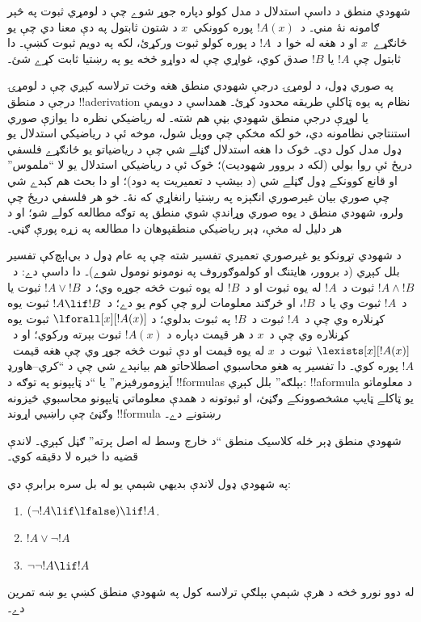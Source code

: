 \documentclass[../../../include/open-logic-section]{subfiles}
\begin{document}
شهودي منطق د داسې استدلال د مدل کولو دپاره جوړ شوے چې د لومړي ثبوت
په څېر ګامونه نۀ مني۔ د~$!A(x)$ پوره کوونکي~$x$ د شتون ثابتول په دې
معنا دي چې يو ځانګړے~$x$ او د هغه له خوا د~$!A$ د پوره کولو ثبوت
ورکړئ، لکه په دويم ثبوت کښې۔ دا ثابتول چې $!A$ يا $!B$ صدق کوي،
غواړي چې له دواړو څخه يو په رښتيا ثابت کړے شئ۔

په صوري ډول، د لومړۍ درجې شهودي منطق هغه وخت ترلاسه کېږي چې د لومړۍ
درجې د منطق !!a{derivation} نظام په يوه ټاکلې طريقه محدود کړئ۔ همداسې
د دويمې يا لوړې درجې منطق شهودي بڼې هم شته۔ له رياضيکي نظره دا يوازې
صوري استنتاجي نظامونه دي، خو لکه مخکې چې وويل شول، موخه ئې د رياضيکي
استدلال يو ډول مدل کول دي۔ څوک دا هغه استدلال ګڼلے شي چې د رياضياتو
يو ځانګړے فلسفي دريځ ئې روا بولي (لکه د بروور شهوديت)؛ څوک ئې د
رياضيکي استدلال يو لا ``ملموس'' او قانع کوونکے ډول ګڼلے شي (د بيشپ د
تعميريت په دود)؛ او دا بحث هم کېدے شي چې صوري بيان غيرصوري انګېزه په
رښتيا رانغاړي که نۀ۔ خو هر فلسفي دريځ چې ولرو، شهودي منطق د يوه صوري
وړاندې شوي منطق په توګه مطالعه کولے شو؛ او د هر دليل له مخې، ډېر
رياضيکي منطقپوهان دا مطالعه په زړه پورې ګڼي۔

د شهودي تړونکو يو غيرصوري تعميري تفسير شته چې په عام ډول د بي‌اېچ‌کې
تفسير بلل کېږي (د بروور، هايتنګ او کولموګوروف په نومونو نومول شوے)۔
دا داسې دے: د~$!A \land !B$ ثبوت د~$!A$ له يوه ثبوت او د~$!B$ له
يوه ثبوت څخه جوړه وي؛ د~$!A \lor !B$ ثبوت يا د~$!A$ ثبوت وي يا
د~$!B$، او څرګند معلومات لرو چې کوم يو دے؛ د~$!A \lif !B$ ثبوت يوه
کړنلاره وي چې د~$!A$ ثبوت د~$!B$ په ثبوت بدلوي؛ د
$\lforall[x][!A(x)]$ ثبوت يوه کړنلاره وي چې د~$x$ د هر قيمت دپاره د
$!A(x)$ ثبوت بېرته ورکوي؛ او د~$\lexists[x][!A(x)]$ ثبوت د~$x$ له
يوه قيمت او دې ثبوت څخه جوړ وي چې هغه قيمت~$!A$ پوره کوي۔ دا تفسير
په هغو محاسبوي اصطلاحاتو هم بيانېدے شي چې د ``کري--هاورډ
آيزومورفيزم'' يا ``د ټايپونو په توګه د !!{formula}s بېلګه'' بلل
کېږي: !!a{formula} د معلوماتو يو ټاکلے ټايپ مشخصوونکے وګڼئ، او ثبوتونه
د همدې معلوماتي ټايپونو محاسبوي څيزونه وګڼئ چې راښيي اړوند
!!{formula} رښتونے دے۔

شهودي منطق ډېر ځله کلاسیک منطق ``د خارج وسط له اصل پرته'' ګڼل کېږي۔
لاندې قضيه دا خبره لا دقيقه کوي۔
\begin{thm}
په شهودي ډول لاندې بديهي شېمې يو له بل سره برابرې دي:
\begin{enumerate}
\item $(\lnot !A \lif \lfalse) \lif !A$.
\item $!A \lor \lnot !A$
\item $\lnot \lnot !A \lif !A$
\end{enumerate}
\end{thm}
له دوو نورو څخه د هرې شېمې بېلګې ترلاسه کول په شهودي منطق کښې يو ښه
تمرين دے۔
\end{document}
